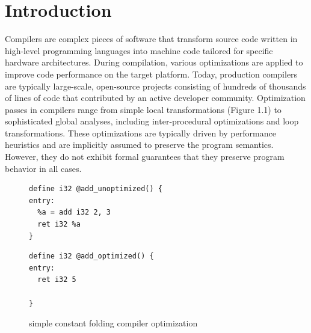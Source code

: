 

\chapter{Introduction}

Compilers are complex pieces of software that transform source code written in high-level programming languages into machine code tailored for specific hardware architectures. During compilation, various optimizations are applied to improve code performance on the target platform. Today, production compilers are typically large-scale, open-source projects consisting of hundreds of thousands of lines of code that contributed by an active developer community. Optimization passes in compilers range from simple local transformations (Figure 1.1)  to sophisticated global analyses, including inter-procedural optimizations and loop transformations. These optimizations are typically driven by performance heuristics and are implicitly assumed to preserve the program semantics. However, they do not exhibit formal guarantees that they preserve program behavior in all cases. 

\begin{figure}[ht]
\centering
\begin{minipage}{0.45\textwidth}
\tinytiny %
\begin{lstlisting}
define i32 @add_unoptimized() {
entry:
  %a = add i32 2, 3
  ret i32 %a
}
\end{lstlisting}
\end{minipage}
\hspace{0.05\textwidth}
\begin{minipage}{0.45\textwidth}
\tinytiny
\begin{lstlisting}
define i32 @add_optimized() {
entry:
  ret i32 5
  
}
\end{lstlisting}
\end{minipage}
\caption{simple constant folding compiler optimization}
\label{fig:llvm-constant-folding}
\end{figure}

